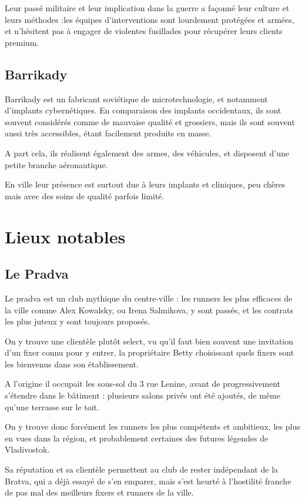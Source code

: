 \documentclass[10pt,a4paper]{book}
\begin{document}
Leur passé militaire et leur implication dans la guerre a façonné leur culture et leurs méthodes :les équipes d'interventions sont lourdement protégées et armées, et n'hésitent pas à engager de violentes fusillades pour récupérer leurs clients premium.
\section{Barrikady}
Barrikady est un fabricant soviétique de microtechnologie, et notamment d'implants cybernétiques. En comparaison des implants occidentaux, ils sont souvent considérés comme de mauvaise qualité et grossiers, mais ils sont souvent aussi très accessibles, étant facilement produits en masse.

A part cela, ils réalisent également des armes, des véhicules, et disposent d'une petite branche aéronautique.

En ville leur présence est surtout due à leurs implants et cliniques, peu chères mais avec des soins de qualité parfois limité.

\chapter{Lieux notables}
\section{Le Pradva}
Le pradva est un club mythique du centre-ville : les runners les plus efficaces de la ville comme Alex Kowalsky, ou Irena Salmikova, y sont passés, et les contrats les plus juteux y sont toujours proposés.

On y trouve une clientèle plutôt select, vu qu'il faut bien souvent une invitation d'un fixer connu pour y entrer, la propriétaire Betty choisissant quels fixers sont les bienvenus dans son établissement.

A l'origine il occupait les sous-sol du 3 rue Lenine, avant de progressivement s'étendre dans le bâtiment : plusieurs salons privés ont été ajoutés, de même qu'une terrasse sur le toit.

On y trouve donc forcément les runners les plus compétents et ambitieux, les plus en vues dans la région, et probablement certaines des futures légendes de Vladivostok.

Sa réputation et sa clientèle permettent au club de rester indépendant de la Bratva, qui a déjà essayé de s'en emparer, mais s'est heurté à l'hostilité franche de pas mal des meilleurs fixers et runners de la ville.
\end{document}
